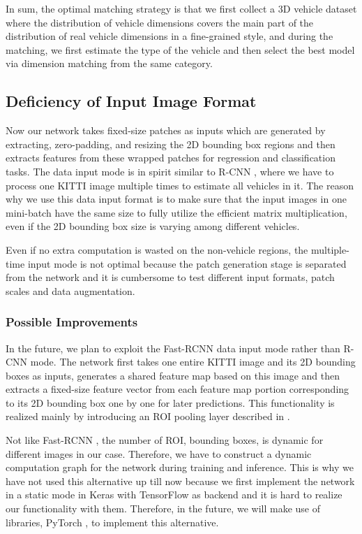\documentclass[a4paper,12pt]{article}
\begin{document}
In sum, the optimal matching strategy is that we first collect a 3D vehicle dataset where the distribution of vehicle dimensions covers the main part of the distribution of real vehicle dimensions in a fine-grained style, and during the matching, we first estimate the type of the vehicle and then select the best model via dimension matching from the same category. 

\subsection{Deficiency of Input Image Format}

Now our network takes fixed-size patches as inputs which are generated by extracting, zero-padding, and resizing the 2D bounding box regions and then extracts features from these wrapped patches for regression and classification tasks. The data input mode is in spirit similar to R-CNN \cite{DBLP:journals/corr/GirshickDDM13}, where we have to process one KITTI image multiple times to estimate all vehicles in it. The reason why we use this data input format is to make sure that the input images in one mini-batch have the same size to fully utilize the efficient matrix multiplication, even if the 2D bounding box size is varying among different vehicles.

Even if no extra computation is wasted on the non-vehicle regions, the multiple-time input mode is not optimal because the patch generation stage is separated from the network and it is cumbersome to test different input formats, \ie patch scales and data augmentation.

\subsubsection{Possible Improvements}
In the future, we plan to exploit the Fast-RCNN \cite{DBLP:journals/corr/Girshick15} data input mode rather than R-CNN mode. The network first takes one entire KITTI image and its 2D bounding boxes as inputs, generates a shared feature map based on this image and then extracts a fixed-size feature vector from each feature map portion corresponding to its 2D bounding box one by one for later predictions. This functionality is realized mainly by introducing an ROI pooling layer described in \cite{DBLP:journals/corr/Girshick15}.

Not like Fast-RCNN \cite{DBLP:journals/corr/Girshick15}, the number of ROI, \ie bounding boxes, is dynamic for different images in our case. Therefore, we have to construct a dynamic computation graph for the network during training and inference. This is why we have not used this alternative up till now because we first implement the network in a static mode in Keras \cite{chollet2015keras} with TensorFlow \cite{tensorflow2015-whitepaper} as backend and it is hard to realize our functionality with them. Therefore, in the future, we will make use of libraries, \ie PyTorch \cite{paszke2017automatic}, to implement this alternative.
\end{document}
